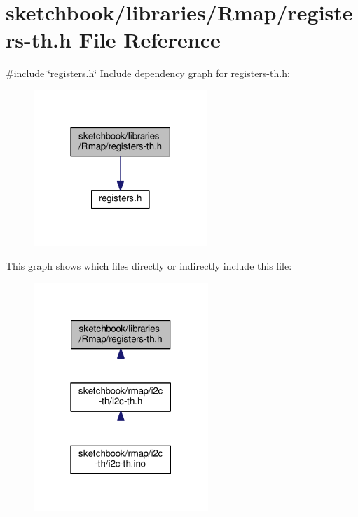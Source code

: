 \hypertarget{registers-th_8h}{}\section{sketchbook/libraries/\+Rmap/registers-\/th.h File Reference}
\label{registers-th_8h}
{\ttfamily \#include \char`\"{}registers.\+h\char`\"{}}\newline
Include dependency graph for registers-\/th.h\+:
\nopagebreak
\begin{figure}[H]
\begin{center}
\leavevmode
\includegraphics[width=186pt]{registers-th_8h__incl}
\end{center}
\end{figure}
This graph shows which files directly or indirectly include this file\+:
\nopagebreak
\begin{figure}[H]
\begin{center}
\leavevmode
\includegraphics[width=187pt]{registers-th_8h__dep__incl}
\end{center}
\end{figure}
